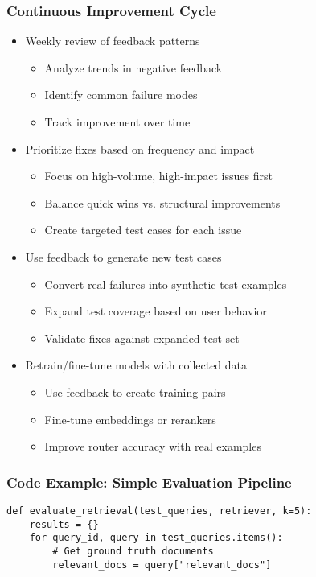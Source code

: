 {    \begin{frame}
        \frametitle{Continuous Improvement Cycle}
        \begin{itemize}
            \item Weekly review of feedback patterns
            \begin{itemize}
                \item Analyze trends in negative feedback
                \item Identify common failure modes
                \item Track improvement over time
            \end{itemize}
            \item Prioritize fixes based on frequency and impact
            \begin{itemize}
                \item Focus on high-volume, high-impact issues first
                \item Balance quick wins vs. structural improvements
                \item Create targeted test cases for each issue
            \end{itemize}
            \item Use feedback to generate new test cases
            \begin{itemize}
                \item Convert real failures into synthetic test examples
                \item Expand test coverage based on user behavior
                \item Validate fixes against expanded test set
            \end{itemize}
            \item Retrain/fine-tune models with collected data
            \begin{itemize}
                \item Use feedback to create training pairs
                \item Fine-tune embeddings or rerankers
                \item Improve router accuracy with real examples
            \end{itemize}
        \end{itemize}
    \end{frame}

    \begin{frame}[fragile]
        \frametitle{Code Example: Simple Evaluation Pipeline}
        \begin{lstlisting}[basicstyle=\tiny\ttfamily, breaklines=true]
def evaluate_retrieval(test_queries, retriever, k=5):
    results = {}
    for query_id, query in test_queries.items():
        # Get ground truth documents
        relevant_docs = query["relevant_docs"]
        

\end{lstlisting}
\end{frame}}
